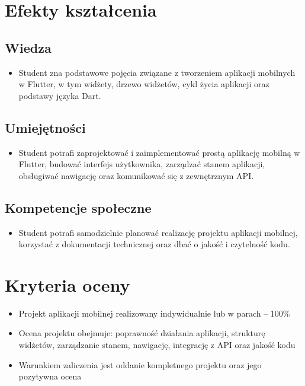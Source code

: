 \documentclass[12pt, a4paper]{article}
\begin{document}
\section{Efekty kształcenia}

\subsection*{Wiedza}
\begin{itemize}
  \item Student zna podstawowe pojęcia związane z tworzeniem aplikacji mobilnych w Flutter, w tym widżety, drzewo widżetów, cykl życia aplikacji oraz podstawy języka Dart.
\end{itemize}

\subsection*{Umiejętności}
\begin{itemize}
  \item Student potrafi zaprojektować i zaimplementować prostą aplikację mobilną w Flutter, budować interfejs użytkownika, zarządzać stanem aplikacji, obsługiwać nawigację oraz komunikować się z zewnętrznym API.
\end{itemize}

\subsection*{Kompetencje społeczne}
\begin{itemize}
  \item Student potrafi samodzielnie planować realizację projektu aplikacji mobilnej, korzystać z dokumentacji technicznej oraz dbać o jakość i czytelność kodu.
\end{itemize}

\section{Kryteria oceny}

\begin{itemize}
  \item Projekt aplikacji mobilnej realizowany indywidualnie lub w parach – 100\%
  \item Ocena projektu obejmuje: poprawność działania aplikacji, strukturę widżetów, zarządzanie stanem, nawigację, integrację z API oraz jakość kodu
  \item Warunkiem zaliczenia jest oddanie kompletnego projektu oraz jego pozytywna ocena
\end{itemize}
\end{document}

